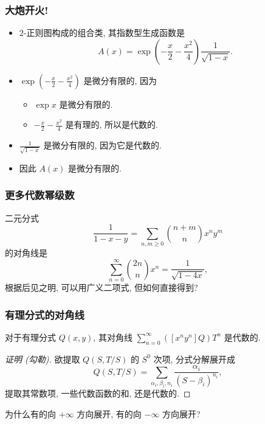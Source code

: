 \documentclass{ctexbeamer}
\begin{document}
\begin{frame}
  \frametitle{大炮开火!}

  \begin{itemize}
    \item $2$-正则图构成的组合类, 其指数型生成函数是
    \begin{equation}
      A(x) = \exp \left( -\frac x 2 - \frac{x^2}{4} \right) \frac 1{\sqrt{1-x}}.
    \end{equation}
    \pause
    \item $\exp \left( -\frac x 2 - \frac{x^2}{4} \right)$ 是微分有限的, 因为
    \pause
    \begin{itemize}
      \item $\exp x$ 是微分有限的.
      \pause
      \item $-\frac x 2 - \frac{x^2}{4}$ 是有理的, 所以是代数的.
    \end{itemize}
    \pause
    \item $\frac 1{\sqrt{1-x}}$ 是微分有限的, 因为它是代数的.
    \pause
    \item 因此 $A(x)$ 是微分有限的.
  \end{itemize}

\end{frame}

\begin{frame}
  \frametitle{更多代数幂级数}

  二元分式
  \begin{equation}
    \frac 1{1 - x - y} = \sum_{n, m \geq 0} \binom{n+m}{n} x^n y^m
  \end{equation}
  的对角线是
  \begin{equation}
    \sum_{n=0}^\infty \binom{2n}{n} x^n = \frac 1{\sqrt{1 - 4x}},
  \end{equation}
  根据后见之明, 可以用广义二项式, 但如何直接得到?

\end{frame}

\begin{frame}
  \frametitle{有理分式的对角线}

  \begin{theorem}
    对于有理分式 $Q(x, y)$, 其对角线 $\sum_{n=0}^\infty ([x^ny^n]Q) T^n$ 是代数的.
  \end{theorem}
  \begin{proof}[证明 (勾勒)]
    欲提取 $Q(S, T/S)$ 的 $S^0$ 次项, 分式分解展开成
    \begin{equation}
      Q(S, T/S) = \sum_{\alpha_i, \beta_i, n_i} \frac{\alpha_i}{(S - \beta_i)^{n_i}},
    \end{equation}
    提取其常数项, 一些代数函数的和, 还是代数的.
  \end{proof}
  为什么有的向 $+\infty$ 方向展开, 有的向 $-\infty$ 方向展开?

\end{frame}
\end{document}
